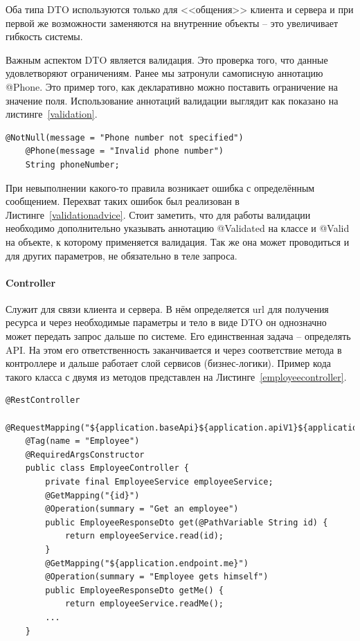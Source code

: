 \documentclass[a4paper,article]{article}
\begin{document}
\begin{sloppypar}
    Оба типа DTO используются только для <<общения>> клиента и сервера и при первой же возможности заменяются на внутренние объекты -- это увеличивает гибкость системы.

    Важным аспектом DTO является валидация. Это проверка того, что данные удовлетворяют ограничениям. Ранее мы затронули самописную аннотацию @Phone. Это пример того, как декларативно можно поставить ограничение на значение поля. Использование аннотаций валидации выглядит как показано на листинге~\ref{validation}.

    \begin{lstlisting}[label=validation,caption=Пример валидации]
    @NotNull(message = "Phone number not specified")
    @Phone(message = "Invalid phone number")
    String phoneNumber;
    \end{lstlisting}

    При невыполнении какого-то правила возникает ошибка с определённым сообщением. Перехват таких ошибок был реализован в Листинге~\ref{validationadvice}. Стоит заметить, что для работы валидации необходимо дополнительно указывать аннотацию @Validated на классе и @Valid на объекте, к которому применяется валидация. Так же она может проводиться и для других параметров, не обязательно в теле запроса.

    \paragraph{Controller}\label{Реализация. Сервер. Controller}

    Служит для связи клиента и сервера. В нём определяется url для получения ресурса и через необходимые параметры и тело в виде DTO он однозначно может передать запрос дальше по системе. Его единственная задача -- определять API. На этом его ответственность заканчивается и через соответствие метода в контроллере и дальше работает слой сервисов (бизнес-логики). Пример кода такого класса с двумя из методов представлен на Листинге~\ref{employeecontroller}.

    \begin{lstlisting}[label=employeecontroller,caption=Пример класса слоя представления]
    @RestController
    @RequestMapping("${application.baseApi}${application.apiV1}${application.endpoint.employees}")
    @Tag(name = "Employee")
    @RequiredArgsConstructor
    public class EmployeeController {
        private final EmployeeService employeeService;
        @GetMapping("{id}")
        @Operation(summary = "Get an employee")
        public EmployeeResponseDto get(@PathVariable String id) {
            return employeeService.read(id);
        }
        @GetMapping("${application.endpoint.me}")
        @Operation(summary = "Employee gets himself")
        public EmployeeResponseDto getMe() {
            return employeeService.readMe();
        ...
    }
    \end{lstlisting}


\end{sloppypar}
\end{document}
